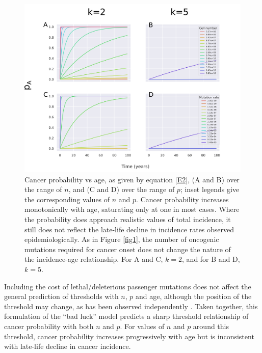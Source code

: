 \documentclass[10pt,twocolumn,twoside]{article}
\begin{document}
\begin{figure}[tbhp]
	\centering
	\includegraphics[width=\linewidth]{fig2.png}
	\caption{Cancer probability vs age, as given by equation \ref{E2}, (A and B) over the range of $n$, and (C and D) over the range of $p$; inset legends give the corresponding values of $n$ and $p$. Cancer probability increases monotonically with age, saturating only at one in most cases. Where the probability does approach realistic values of total incidence, it still does not reflect the late-life decline in incidence rates observed epidemiologically. As in Figure \ref{fig1}, the number of oncogenic mutations required for cancer onset does not change the nature of the incidence-age relationship. For A and C, $k=2$, and for B and D, $k=5$.}
	\label{fig2}
\end{figure}

Including the cost of lethal/deleterious passenger mutations does not affect the general prediction of thresholds with $n$, $p$ and age, although the position of the threshold may change, as has been observed independently \cite{McFarland2013}. Taken together, this formulation of the ``bad luck'' model predicts a sharp threshold relationship of cancer probability with both $n$ and $p$. For values of $n$ and $p$ around this threshold, cancer probability increases progressively with age but is inconsistent with late-life decline in cancer incidence. 
\end{document}
